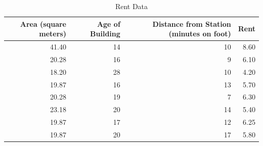\begin{table}[ht]
	\caption{Rent Data}
	\label{tab:ex11_01}
	\centering
	\begin{tabular}[t]{rrrr}
		\hline
		Area (square meters) & Age of Building & Distance from Station (minutes on foot) & Rent \\\hline
		41.40                & 14              & 10                                      & 8.60 \\
		20.28                & 16              & 9                                       & 6.10 \\
		18.20                & 28              & 10                                      & 4.20 \\
		19.87                & 16              & 13                                      & 5.70 \\
		20.28                & 19              & 7                                       & 6.30 \\
		23.18                & 20              & 14                                      & 5.40 \\
		19.87                & 17              & 12                                      & 6.25 \\
		19.87                & 20              & 17                                      & 5.80 \\
		\hline
	\end{tabular}
\end{table}
